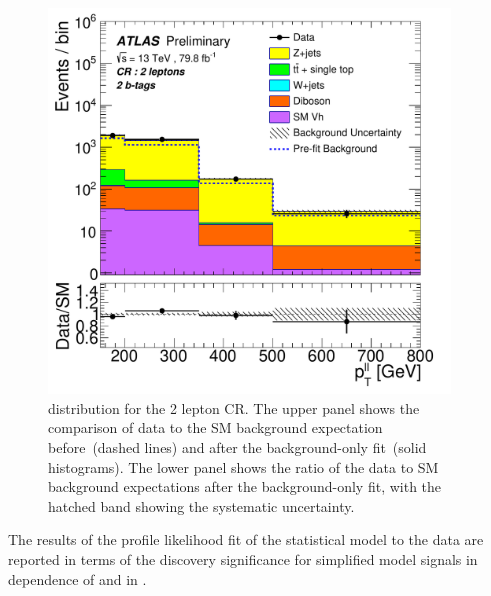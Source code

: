 \begin{figure}[htbp]
\centering
\includegraphics[width=0.95\textwidth]{figures/monoH/results/fig_05c.pdf}
\caption{\ptll distribution for the 2 lepton CR. The upper panel shows the comparison of data to the SM background expectation before~(dashed lines) and after the background-only fit~(solid histograms). The lower panel shows the ratio of the data to SM background expectations after the background-only fit, with the hatched band showing the systematic uncertainty.}
  \label{fig:monoH:results:observed:cr2}
\end{figure}


The results of the profile likelihood fit of the statistical model to the data are reported in terms of the discovery significance for \zhdm simplified model signals in dependence of \mZp and \mA in .

